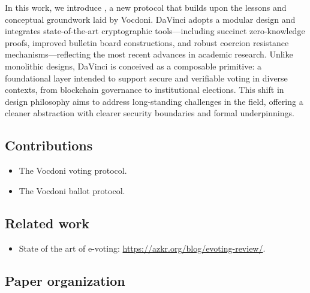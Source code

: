In this work, we introduce \davinci, a new protocol that builds upon the lessons and conceptual groundwork laid by Vocdoni. DaVinci adopts a modular design and integrates state-of-the-art cryptographic tools—including succinct zero-knowledge proofs, improved bulletin board constructions, and robust coercion resistance mechanisms—reflecting the most recent advances in academic research. Unlike monolithic designs, DaVinci is conceived as a composable primitive: a foundational layer intended to support secure and verifiable voting in diverse contexts, from blockchain governance to institutional elections. This shift in design philosophy aims to address long-standing challenges in the field, offering a cleaner abstraction with clearer security boundaries and formal underpinnings.

\subsection{Contributions}
\label{sec:introduction:contributions}

\begin{itemize}
	\item The Vocdoni voting protocol.
	\item The Vocdoni ballot protocol.
\end{itemize}

\subsection{Related work}
\label{sec:introduction:sota}

\begin{itemize}
	\item State of the art of e-voting: \url{https://azkr.org/blog/evoting-review/}.
\end{itemize}

\subsection{Paper organization}
\label{sec:introduction:organization}

